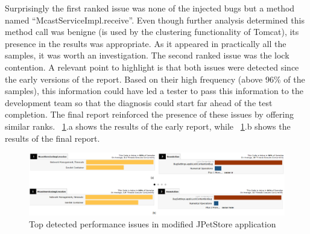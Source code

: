 \documentclass[runningheads,a4paper]{llncs}
\begin{document}
Surprisingly the first ranked issue was none of the injected bugs but a method
named ``McastServiceImpl.receive''. Even though further analysis determined
this method call was benigne (is used by the clustering functionality of
Tomcat), its presence in the results was appropriate. As it appeared in
practically all the samples, it was worth an investigation. The second ranked
issue was the lock contention. A relevant point to highlight is that both issues
were detected since the early versions of the report. Based on their high
frequency (above 96\% of the samples), this information could have led a tester
to pass this information to the development team so that the diagnosis could
start far ahead of the test completion. The final report reinforced the presence
of these issues by offering similar ranks. \figurename ~\ref{fig_run1_bugs12}.a
shows the results of the early report, while ~\ref{fig_run1_bugs12}.b shows the
results of the final report.
\vspace{-5pt}
\begin{figure}[!h]
\includegraphics[totalheight=.22\textheight,width=1\textwidth]{run1_issues12_short_long_run}
\caption{Top detected performance issues in modified JPetStore application}
\label{fig_run1_bugs12}
\end{figure}
\vspace{-5pt}
\end{document}
